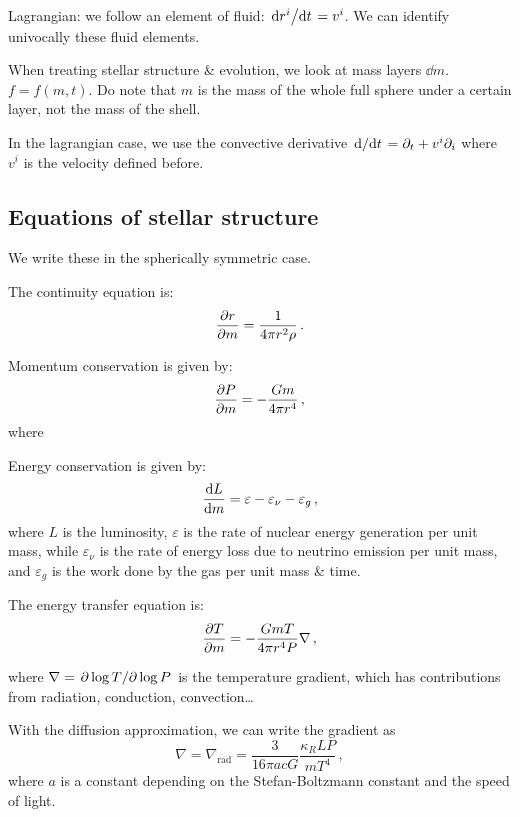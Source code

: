 \documentclass[main.tex]{subfiles}
\begin{document}
Lagrangian: we follow an element of fluid: \(\dv*{r^i}{t} = v^i \). We can identify univocally these fluid elements.

When treating stellar structure \& evolution, we look at mass layers \(\dd{m}\).  \(f = f(m, t)\). Do note that \(m\) is the mass of the whole full sphere under a certain layer, not the mass of the shell.

In the lagrangian case, we use the convective derivative \(\dv*{}{t} = \partial_t + v^i \partial_i\) where \(v^i\) is the velocity defined before.

\subsection{Equations of stellar structure}

We write these in the spherically symmetric case.

The continuity equation is:
%
\begin{equation}
    \pdv{r}{m} = \frac{1}{4 \pi r^2 \rho} \,.
\end{equation}

Momentum conservation is given by:
%
\begin{equation}
    \pdv{P}{m} = - \frac{Gm}{4 \pi r^4}\,,
\end{equation}
%
where

Energy conservation is given by:
%
\begin{equation}
    \dv{L}{m} = \varepsilon - \varepsilon_\nu - \varepsilon_g \,,
\end{equation}
%
where \(L\) is the luminosity, \(\varepsilon\) is the rate of nuclear energy generation per unit mass, while \(\varepsilon_\nu\) is the rate of energy loss due to neutrino emission per unit mass, and \(\varepsilon_g \) is the work done by the gas per unit mass \& time.

The energy transfer equation is:
%
\begin{equation}
    \pdv{T}{m} = - \frac{GmT}{4 \pi r^4 P} \nabla \,,
\end{equation}

where \(\nabla = \pdv*{\log T}{\log P} \) is the temperature gradient, which has contributions from radiation, conduction, convection\dots

With the diffusion approximation, we can write the gradient as
%
\begin{equation} \label{eq:diffusion-approx-gradient}
    \nabla = \nabla_{\text{rad}} = \frac{3}{16 \pi a c G} \frac{\kappa_R L P}{mT^4} \,,
\end{equation}
%
where \(a\) is a constant depending on the Stefan-Boltzmann constant and the speed of light.
\end{document}
